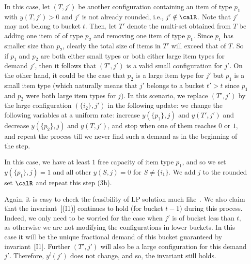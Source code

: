 \medskip {}
In this case, let $(T,j')$ be another configuration containing an item of type $p_1$ with $y(T,j') > 0$ and $j'$ is not already rounded, i.e., $j' \notin \calR$. Note that $j'$ may not belong to bucket $t$. Then, let $T'$ denote the multi-set obtained from $T$ be adding one item of of type $p_2$ and removing one item of type $p_1$. Since $p_1$ has smaller size than $p_2$, clearly the total size of items in $T'$ will exceed that of $T$. So if $p_1$ and $p_2$ are both either small types or both either large item types for demand $j'$, then it follows that $(T',j')$ is a valid small configuration for $j'$. On the other hand, it could be the case that $p_2$ is a large item type for $j'$ but $p_1$ is a small item type (which naturally means that $j'$ belongs to a bucket $t' > t$ since $p_1$ and $p_2$ were both large item types for $j$). In this scenario, we replace $(T',j')$ by the large configuration $(\{i_2\},j')$ in the following update: we change the following variables at a uniform rate: increase $y(\{p_1\},j)$ and $y(T',j')$ and decrease $y(\{p_2\},j)$ and $y(T,j')$, and stop when one of them reaches $0$ or $1$, and repeat the process till we never find such a demand as in the beginning of the step.

\medskip {}
In this case, we have at least $1$ free capacity of item type $p_1$, and so we set $y(\{p_1\},j)= 1$ and all other $y(S,j) = 0$ for $S \neq \{i_1\}$. We add $j$ to the rounded set $\calR$ and repeat this step (3b).

Again, it is easy to check the feasibility of LP solution much like~. We also claim that the invariant~[(I1)] continues to hold (for bucket $t-1$) during this process. Indeed, we only need to be worried for the case when $j'$ is of bucket less than $t$, as otherwise we are not modifying the configurations in lower buckets. In this case it will be the unique fractional demand of this bucket guaranteed by invariant~[I1]. Further $(T',j')$ will also be a large configuration for this demand $j'$. Therefore, $y^l(j')$ does not change, and so, the invariant still holds.

